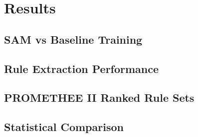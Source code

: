 \documentclass[../main.tex]{subfiles}
\begin{document}
\chapter{Results}
\label{ch:results}


\section{SAM vs Baseline Training}
\label{sec:results-sam}

\section{Rule Extraction Performance}
\label{sec:results-rule-extraction}

\section{PROMETHEE II Ranked Rule Sets}
\label{sec:results-promethee}

\section{Statistical Comparison}
\label{sec:results-statistics}
\end{document}
